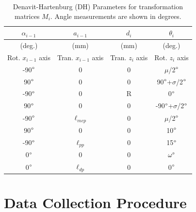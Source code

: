\documentclass[journal]{IEEEtran}
\begin{document}
\begin{table}
	\centering
	\caption{Denavit-Hartenburg (DH) Parameters for transformation matrices $M_i$. Angle measurements are shown in degrees.}
		\begin{tabular}{c|c|c|c}
		$\alpha_{i-1}$ & $a_{i-1}$ & $d_i$ & $\theta_i$ \\
		\hline
		(deg.) & (mm) & (mm) & (deg.) \\
		Rot. $x_{i-1}$ axis & Tran. $x_{i-1}$ axis & Tran. $z_i$ axis & Rot. $z_i$ axis \\
		\hline
		\hline
 -90$\degree$ & 0 & 0 & $\mu$/2$\degree$\\
 90$\degree$ & 0 & 0 & 90$\degree$+$\sigma$/2$\degree$\\
 -90$\degree$ & 0 & R & 0$\degree$\\
 90$\degree$ & 0 & 0 & -90$\degree$+$\sigma$/2$\degree$\\
 -90$\degree$ & $\ell_{mcp}$ & 0 & $\mu$/2$\degree$\\
 90$\degree$ & 0 & 0 & 10$\degree$\\
 -90$\degree$ & $\ell_{pp}$ & 0 & 15$\degree$\\
 0$\degree$ & 0 & 0 & $\omega\degree$\\
 0$\degree$ & $\ell_{dp}$ & 0 & 0$\degree$\\
 \hline
 \hline
	\end{tabular}
	\label{tabl}
\end{table}

\section{Data Collection Procedure}
\label{datasection}
\end{document}
